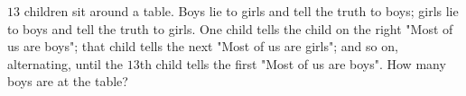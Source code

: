 $13$ children sit around a table. Boys lie to girls and tell the truth to boys; girls lie to boys and tell the truth to girls. One child tells the child on the right "Most of us are boys"; that child tells the next "Most of us are girls"; and so on, alternating, until the $13$th child tells the first "Most of us are boys". How many boys are at the table?
